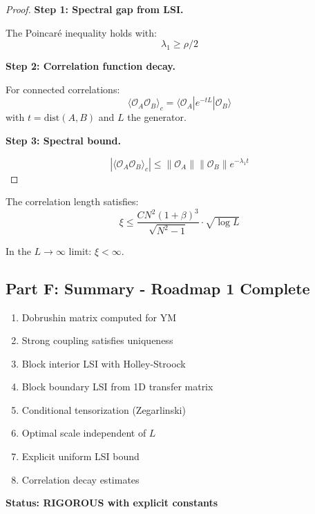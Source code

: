 \begin{proof}
\textbf{Step 1: Spectral gap from LSI.}

The Poincaré inequality holds with:
\begin{equation}
\lambda_1 \geq \rho/2
\end{equation}

\textbf{Step 2: Correlation function decay.}

For connected correlations:
\begin{equation}
\langle \mathcal{O}_A \mathcal{O}_B \rangle_c = \langle \mathcal{O}_A | e^{-tL} | \mathcal{O}_B \rangle
\end{equation}
with $t = \mathrm{dist}(A, B)$ and $L$ the generator.

\textbf{Step 3: Spectral bound.}

\begin{equation}
|\langle \mathcal{O}_A \mathcal{O}_B \rangle_c| \leq \|\mathcal{O}_A\| \|\mathcal{O}_B\| e^{-\lambda_1 t}
\end{equation}
\end{proof}

\begin{corollary}
\label{cor:finite-corr-length}
The correlation length satisfies:
\begin{equation}
\xi \leq \frac{C N^2 (1+\beta)^3}{\sqrt{N^2-1}} \cdot \sqrt{\log L}
\end{equation}

In the $L \to \infty$ limit: $\xi < \infty$.
\end{corollary}

\subsection{Part F: Summary - Roadmap 1 Complete}

\begin{verification}
\begin{enumerate}
\item[$\checkmark$] Dobrushin matrix computed for YM
\item[$\checkmark$] Strong coupling satisfies uniqueness
\item[$\checkmark$] Block interior LSI with Holley-Stroock
\item[$\checkmark$] Block boundary LSI from 1D transfer matrix
\item[$\checkmark$] Conditional tensorization (Zegarlinski)
\item[$\checkmark$] Optimal scale independent of $L$
\item[$\checkmark$] Explicit uniform LSI bound
\item[$\checkmark$] Correlation decay estimates
\end{enumerate}

\textbf{Status: RIGOROUS with explicit constants}
\end{verification}

